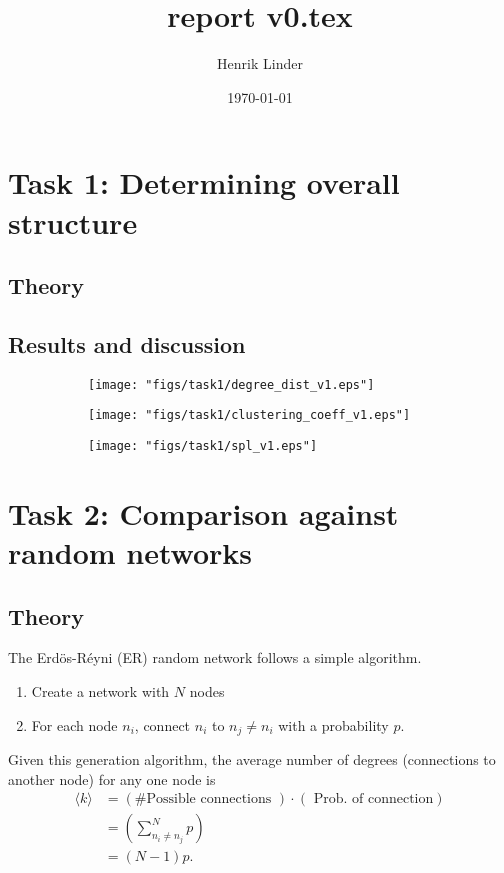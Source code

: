 \documentclass{article}
\title{report v0.tex }
\author{Henrik Linder}
\date{\today}
\begin{document}
\maketitle



\section{Task 1: Determining overall structure}
\subsection{Theory}
\subsection{Results and discussion}
\begin{figure}[H]
	\centering
	\begin{subfigure}[b]{.3\textwidth}
		\centering
		\texttt{[image: "figs/task1/degree\_dist\_v1.eps"]}
		\caption{}
		\label{fig:task1_degree_dist}
	\end{subfigure}
	\begin{subfigure}[b]{.3\textwidth}
		\centering
		\texttt{[image: "figs/task1/clustering\_coeff\_v1.eps"]}
		\caption{}
		\label{fig:task1_clustering_coeff}
	\end{subfigure}
	\begin{subfigure}[b]{.3\textwidth}
		\centering
		\texttt{[image: "figs/task1/spl\_v1.eps"]}
		\caption{}
		\label{fig:task1_spl}
	\end{subfigure}
\end{figure}

\section{Task 2: Comparison against random networks}
\subsection{Theory}
The Erdös-Réyni (ER) random network follows a simple algorithm. 
\begin{enumerate}
	\item Create a network with $N$ nodes 
	\item For each node $n_i$, connect $n_i$ to $n_j\neq n_i$ with a probability $p$.
\end{enumerate}

Given this generation algorithm, the average number of degrees (connections to another node) for any one node is 
\begin{equation}
	\begin{split}
	\langle k\rangle &= (\text{\#Possible connections })\cdot(\text{ Prob. of connection})\\
						 &=\left( \sum_{n_i\neq n_j}^N p \right)\\
						 &= (N-1)p.
	\end{split}
\end{equation}
\end{document}

